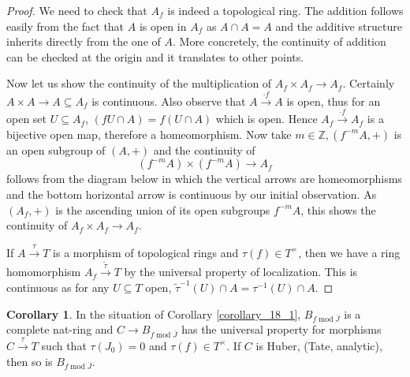 \documentclass[10pt]{article}
\numberwithin{equation}{section}
\theoremstyle{definition}
\newtheorem{corollary}{Corollary} [subsection]
\DeclareMathOperator{\tmod}{mod}
\newcommand{\Z}[0]{\mathbb{Z}}
\begin{document}
\begin{proof}
We need to check that $A_f$ is indeed a topological ring. The addition follows easily from the fact that $A$ is open in $A_f$ as $A\cap A = A$ and the additive structure inherits directly from the one of $A$.
More concretely, the continuity of addition can be checked at the origin and it translates to other points.
\par Now let us show the continuity of the multiplication of $A_f\times A_f\to A_f$. Certainly $A\times A\to A\subseteq A_f$ is continuous.
Also observe that $A\stackrel{\cdot f}{\to}A$ is open, thus for an open set $U\subseteq A_f$, $(fU\cap A) = f(U\cap A)$ which is open. Hence $A_f\stackrel{\cdot f}{\to}A_f$ is a bijective open map, therefore a homeomorphism.
Now take $m\in\Z,(f^{-m}A,+)$ is an open subgroup of $(A,+)$ and the continuity of
\begin{equation*}
    (f^{-m}A)\times(f^{-m}A)\to A_f
\end{equation*}
follows from the diagram below in which the vertical arrows are homeomorphisms and the bottom horizontal arrow is continuous by our initial observation. As $(A_f,+)$ is the ascending union of its open subgroups $f^{-m}A$, this shows the continuity of $A_f\times A_f\to A_f$.
\begin{center}
\end{center}
If $A\stackrel{\tau}{\to}T$ is a morphism of topological rings and $\tau(f)\in T^\times$, then we have a ring homomorphism $A_f\stackrel{\tilde{\tau}}{\to}T$ by the universal property of localization. This is continuous as for any $U\subseteq T$ open,  $\tilde{\tau}^{-1}(U)\cap A = \tau^{-1}(U)\cap A$.
\end{proof}
\begin{corollary}
    \label{corollary_19_2}
    In the situation of Corollary \ref{corollary_18_1}, $B_{f\tmod\overline{J}}$ is a complete nat-ring and $C\to B_{f\tmod{\overline{J}}}$ has the universal property for morphisms $C\stackrel{\tau}{\to}T$ such that $\tau(J_0)=0$ and $\tau(f)\in T^\times$. If $C$ is Huber, (Tate, analytic), then so is $B_{f\tmod{\overline{J}}}$.
\end{corollary}
\end{document}
